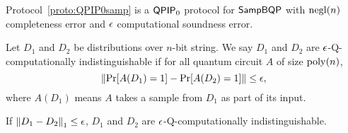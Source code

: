 \begin{theorem}\label{thm:qpip0}
    Protocol~\ref{proto:QPIP0samp} is a $\operatorname{\mathsf{QPIP}}_0$ protocol for $\operatorname{\mathsf{SampBQP}}$ with $\operatorname{negl}(n)$ completeness error and $\epsilon$ computational soundness error. 
\end{theorem}

\begin{definition}
Let  $D_1$ and $D_2$ be distributions over $n$-bit string.  We say $D_1$ and $D_2$  are $\epsilon$-Q-computationally indistinguishable if for all quantum circuit $A$ of size $\operatorname*{\operatorname{poly}}(n)$, $$\left\|\Pr[A({D_1})=1]-\Pr[A({D_2})=1]  \right\| \leq \epsilon,$$  where $A(D_1)$ means $A$ takes a sample from $D_1$ as part of its input. 
\end{definition}

\begin{rmk}
If $\left\lVert D_1-D_2\right\rVert_1\leq \epsilon$, $D_1$ and $D_2$ are $\epsilon$-Q-computationally indistinguishable.
\end{rmk}




